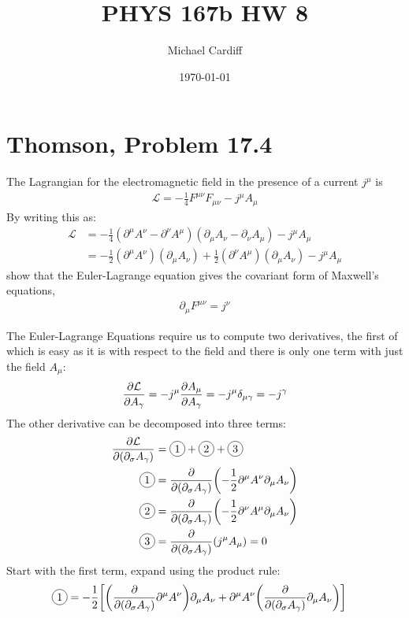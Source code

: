 \documentclass[12pt]{article}
\title{\vspace{-3em}PHYS 167b HW 8}
\author{Michael Cardiff}
\date{\today}
\renewcommand{\L}{\mathcal{L}}
\newcommand{\D}{\partial}
\newcommand{\circled}[1]{\tikz[baseline=(char.base)]{
    \node[shape=circle,draw,inner sep=2pt](char){#1};}}
\begin{document}
\maketitle

\section{Thomson, Problem 17.4}
\begin{problem}
  The Lagrangian for the electromagnetic field in the presence of a current $j^\mu$ is
  \begin{align*}
    \L=-\frac14F^{\mu\nu}F_{\mu\nu}-j^\mu A_\mu
  \end{align*}
  By writing this as:
  \begin{align*}
    \L&=-\frac14
    (\D^\mu A^\nu-\D^\nu A^\mu)(\D_\mu A_\nu-\D_\nu A_\mu)-j^\mu A_\mu\\
    &=-\frac12(\D^\mu A^\nu)(\D_\mu A_\nu)
    +\frac12(\D^\nu A^\mu)(\D_\mu A_\nu)-j^\mu A_\mu
  \end{align*}
  show that the Euler-Lagrange equation gives the covariant form of Maxwell's equations,
  \begin{align*}
    \D_\mu F^{\mu\nu}=j^\nu
  \end{align*}
\end{problem}
The Euler-Lagrange Equations require us to compute two derivatives, the first of which is easy as it is with respect to the field and there is only one term with just the field $A_\mu$:
\begin{align*}
  \pdv{\L}{A_\gamma}=-j^\mu\pdv{A_\mu}{A_\gamma}
  =-j^\mu\delta_{\mu\gamma}=-j^\gamma
\end{align*}
The other derivative can be decomposed into three terms:
\begin{align*}
  \pdv{\L}{(\D_\sigma A_\gamma)}&=\circled{1}+\circled{2}+\circled{3}\\
  \circled{1}&=\pdv{(\D_\sigma A_\gamma)}
  \qty(-\frac12\D^\mu A^\nu\D_\mu A_\nu)\\
  \circled{2}&=\pdv{(\D_\sigma A_\gamma)}
  \qty(-\frac12\D^\nu A^\mu\D_\mu A_\nu)\\
  \circled{3}&=\pdv{(\D_\sigma A_\gamma)}\qty(j^\mu A_\mu)=0
\end{align*}
Start with the first term, expand using the product rule:
\begin{align*}
  \circled{1}&=-\frac12\qty[
  \qty(\pdv{(\D_\sigma A_\gamma)}\D^\mu A^\nu)\D_\mu A_\nu+
  \D^\mu A^\nu\qty(\pdv{(\D_\sigma A_\gamma)}\D_\mu A_\nu)
  ]
\end{align*}
\end{document}
